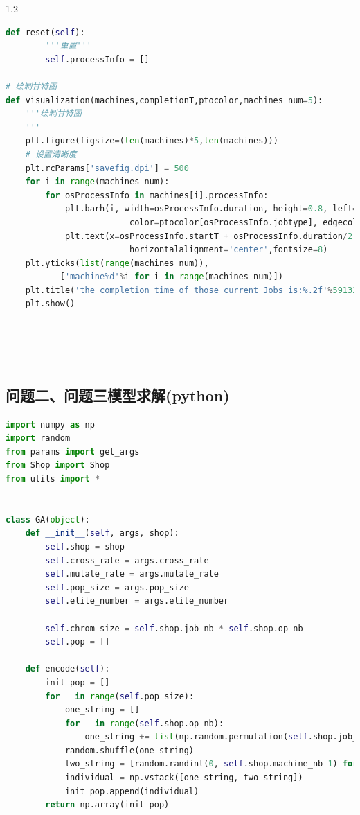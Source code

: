 \documentclass{whutmod}
\begin{document}
\begin{spacing}{1.2}
\begin{lstlisting}[language=python]
    def reset(self):
        '''重置'''
        self.processInfo = []

# 绘制甘特图
def visualization(machines,completionT,ptocolor,machines_num=5):
    '''绘制甘特图
    '''
    plt.figure(figsize=(len(machines)*5,len(machines)))
    # 设置清晰度
    plt.rcParams['savefig.dpi'] = 500
    for i in range(machines_num):
        for osProcessInfo in machines[i].processInfo:
            plt.barh(i, width=osProcessInfo.duration, height=0.8, left=osProcessInfo.startT,align='center',
                         color=ptocolor[osProcessInfo.jobtype], edgecolor='k')
            plt.text(x=osProcessInfo.startT + osProcessInfo.duration/2, y=i, s=f"{osProcessInfo.jobid}/{osProcessInfo.joborder}",
                         horizontalalignment='center',fontsize=8)
    plt.yticks(list(range(machines_num)),
           ['machine%d'%i for i in range(machines_num)])
    plt.title('the completion time of those current Jobs is:%.2f'%59132)
    plt.show()



    
\end{lstlisting}













\subsection{问题二、问题三模型求解(python)}
\begin{lstlisting}[language=python]
import numpy as np
import random
from params import get_args
from Shop import Shop
from utils import *


class GA(object):
    def __init__(self, args, shop):
        self.shop = shop
        self.cross_rate = args.cross_rate
        self.mutate_rate = args.mutate_rate
        self.pop_size = args.pop_size
        self.elite_number = args.elite_number

        self.chrom_size = self.shop.job_nb * self.shop.op_nb
        self.pop = []

    def encode(self):
        init_pop = []
        for _ in range(self.pop_size):
            one_string = []
            for _ in range(self.shop.op_nb):
                one_string += list(np.random.permutation(self.shop.job_nb))
            random.shuffle(one_string)
            two_string = [random.randint(0, self.shop.machine_nb-1) for _ in range(self.chrom_size)]
            individual = np.vstack([one_string, two_string])
            init_pop.append(individual)
        return np.array(init_pop)


\end{lstlisting}
\end{spacing}
\end{document}
